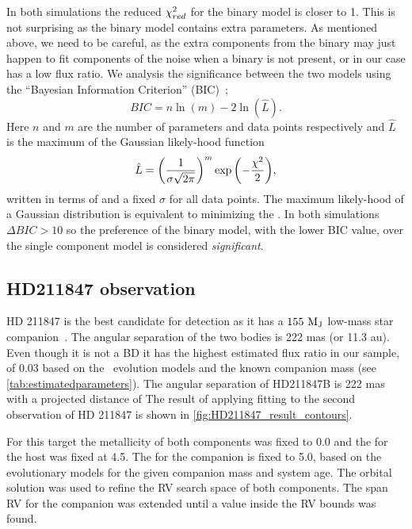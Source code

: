 In both simulations the reduced \({\chi}^{2}_{red}\) for the binary model is closer to 1.
This is not surprising as the binary model contains extra parameters.
As mentioned above, we need to be careful, as the extra components from the binary may just happen to fit components of the noise when a binary is not present, or in our case has a low flux ratio.
{\red{} We analysis the significance between the two models using the ``Bayesian Information Criterion'' ({BIC})~\citep{schwarz_estimating_1978}; }
\begin{equation}
{BIC} = n\ln{(m)} - 2\ln{(\hat{L})}.
\end{equation}
{\red{} Here \(n\) and \(m\) are the number of parameters and data points respectively and \(\hat{L}\) is the maximum of the Gaussian likely-hood function }
\begin{equation}
\hat{L} = {\left(\frac{1}{\sigma \sqrt{2\pi}}\right)}^{m} \exp{\left(-\frac{{\chi}^{2}}{2}\right)},
\end{equation}
{\red{} written in terms of \textchisquared{} and a fixed \(\sigma\) for all data points.
The maximum likely-hood of a Gaussian distribution is equivalent  to minimizing the \textchisquared.
In both simulations \(\Delta {BIC} >10\) so the preference of the binary model, with the lower {BIC} value, over the single component model is considered \emph{significant}.}



\subsection{HD211847 observation}
\label{subsection:results-hd211847}
{HD 211847} is the best candidate for detection as it has a \(\rm 155~M_J\) low-mass star companion~\citet{moutou_eccentricity_2017}.
The angular separation of the two bodies is 222 mas (or 11.3 au).
Even though it is not a {BD} it has the highest estimated flux ratio in our sample, of 0.03 based on the~\citet{baraffe_new_2015} evolution models and the known companion mass (see \cref{tab:estimatedparameters}).
The angular separation of HD211847B is 222 mas with a projected distance of The result of applying \textchisquared{} fitting to the second observation of {HD 211847} is shown in \cref{fig:HD211847_result_contours}.

For this target the metallicity of both components was fixed to 0.0 and the \logg{} for the host was fixed at 4.5.
The \logg{} for the companion is fixed to 5.0, based on the~\citet{baraffe_new_2015} evolutionary models for the given companion mass and system age.
The orbital solution was used to refine the {RV} search space of both components.
The span {RV} for the companion was extended until a value inside the {RV} bounds was found.

